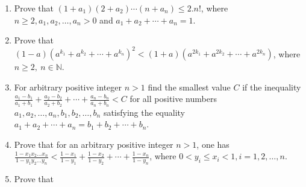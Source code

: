 \begin{enumerate}
\item Prove that $(1 + a_1)(2 + a_2)\cdots(n + a_n)\leq 2.n!$, where $n\geq 2, a_1, a_2, \ldots, a_n > 0$ and $a_1 + a_2 + \cdots +
  a_n = 1$.
\item Prove that $(1 - a)(a^{k_1} + a^{k_2} + \cdots + a^{k_n})^2 < (1 + a)(a^{2k_1} + a^{2k_2} + \cdots + a^{2k_n})$, where $n\geq
  2,~n\in\mathbb{N}$.
\item For arbitrary positive integer $n > 1$ find the smallest value $C$ if the inequality $\frac{a_1 - b_1}{a_1 + b_1} + \frac{a_2
- b_2}{a_2 + b_2} + \cdots + \frac{a_n - b_n}{a_n + b_n} < C$ for all positive numbers $a_1, a_2, \ldots, a_n, b_1, b_2, \ldots,
  b_n$ satisfying the equality $a_1 + a_2 + \cdots + a_n = b_1 + b_2 + \cdots + b_n$.
\item Prove that for an arbitrary positive integer $n > 1$, one has $\frac{1 - x_1x_2\ldots x_n}{1 - y_1y_2\ldots y_n} < \frac{1 -
  x_1}{1 - y_1} + \frac{1 - x_2}{1 - y_2} + \cdots + \frac{1 - x_n}{1 - y_n}$, where $0 < y_i\leq x_i < 1, i = 1, 2, \ldots, n$.
\item Prove that 
\end{enumerate}
